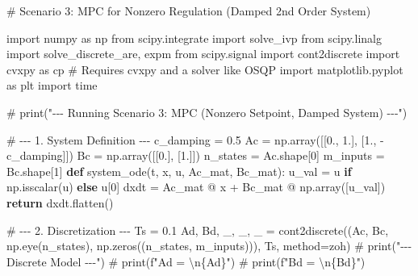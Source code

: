 \documentclass[
  letterpaper,
  DIV=11,
  numbers=noendperiod,
  oneside]{scrartcl}
\newenvironment{Shaded}{\begin{snugshade}}{\end{snugshade}}
\newcommand{\CommentTok}[1]{\textcolor[rgb]{0.37,0.37,0.37}{#1}}
\newcommand{\ControlFlowTok}[1]{\textcolor[rgb]{0.00,0.23,0.31}{\textbf{#1}}}
\newcommand{\DecValTok}[1]{\textcolor[rgb]{0.68,0.00,0.00}{#1}}
\newcommand{\FloatTok}[1]{\textcolor[rgb]{0.68,0.00,0.00}{#1}}
\newcommand{\ImportTok}[1]{\textcolor[rgb]{0.00,0.46,0.62}{#1}}
\newcommand{\KeywordTok}[1]{\textcolor[rgb]{0.00,0.23,0.31}{\textbf{#1}}}
\newcommand{\NormalTok}[1]{\textcolor[rgb]{0.00,0.23,0.31}{#1}}
\newcommand{\OperatorTok}[1]{\textcolor[rgb]{0.37,0.37,0.37}{#1}}
\newcommand{\StringTok}[1]{\textcolor[rgb]{0.13,0.47,0.30}{#1}}
\begin{document}
\begin{Shaded}
\begin{Highlighting}[numbers=left,,]
\CommentTok{\# Scenario 3: MPC for Nonzero Regulation (Damped 2nd Order System)}

\ImportTok{import}\NormalTok{ numpy }\ImportTok{as}\NormalTok{ np}
\ImportTok{from}\NormalTok{ scipy.integrate }\ImportTok{import}\NormalTok{ solve\_ivp}
\ImportTok{from}\NormalTok{ scipy.linalg }\ImportTok{import}\NormalTok{ solve\_discrete\_are, expm}
\ImportTok{from}\NormalTok{ scipy.signal }\ImportTok{import}\NormalTok{ cont2discrete}
\ImportTok{import}\NormalTok{ cvxpy }\ImportTok{as}\NormalTok{ cp }\CommentTok{\# Requires cvxpy and a solver like OSQP}
\ImportTok{import}\NormalTok{ matplotlib.pyplot }\ImportTok{as}\NormalTok{ plt}
\ImportTok{import}\NormalTok{ time}

\CommentTok{\# print("{-}{-}{-} Running Scenario 3: MPC (Nonzero Setpoint, Damped System) {-}{-}{-}")}

\CommentTok{\# {-}{-}{-} 1. System Definition {-}{-}{-}}
\NormalTok{c\_damping }\OperatorTok{=} \FloatTok{0.5}
\NormalTok{Ac }\OperatorTok{=}\NormalTok{ np.array([[}\FloatTok{0.}\NormalTok{, }\FloatTok{1.}\NormalTok{], [}\FloatTok{1.}\NormalTok{, }\OperatorTok{{-}}\NormalTok{c\_damping]])}
\NormalTok{Bc }\OperatorTok{=}\NormalTok{ np.array([[}\FloatTok{0.}\NormalTok{], [}\FloatTok{1.}\NormalTok{]])}
\NormalTok{n\_states }\OperatorTok{=}\NormalTok{ Ac.shape[}\DecValTok{0}\NormalTok{]}
\NormalTok{m\_inputs }\OperatorTok{=}\NormalTok{ Bc.shape[}\DecValTok{1}\NormalTok{]}
\KeywordTok{def}\NormalTok{ system\_ode(t, x, u, Ac\_mat, Bc\_mat):}
\NormalTok{    u\_val }\OperatorTok{=}\NormalTok{ u }\ControlFlowTok{if}\NormalTok{ np.isscalar(u) }\ControlFlowTok{else}\NormalTok{ u[}\DecValTok{0}\NormalTok{]}
\NormalTok{    dxdt }\OperatorTok{=}\NormalTok{ Ac\_mat }\OperatorTok{@}\NormalTok{ x }\OperatorTok{+}\NormalTok{ Bc\_mat }\OperatorTok{@}\NormalTok{ np.array([u\_val])}
    \ControlFlowTok{return}\NormalTok{ dxdt.flatten()}

\CommentTok{\# {-}{-}{-} 2. Discretization {-}{-}{-}}
\NormalTok{Ts }\OperatorTok{=} \FloatTok{0.1}
\NormalTok{Ad, Bd, \_, \_, \_ }\OperatorTok{=}\NormalTok{ cont2discrete((Ac, Bc, np.eye(n\_states), np.zeros((n\_states, m\_inputs))), Ts, method}\OperatorTok{=}\StringTok{\textquotesingle{}zoh\textquotesingle{}}\NormalTok{)}
\CommentTok{\# print("{-}{-}{-} Discrete Model {-}{-}{-}")}
\CommentTok{\# print(f"Ad = \textbackslash{}n\{Ad\}")}
\CommentTok{\# print(f"Bd = \textbackslash{}n\{Bd\}")}


\end{Highlighting}
\end{Shaded}
\end{document}
